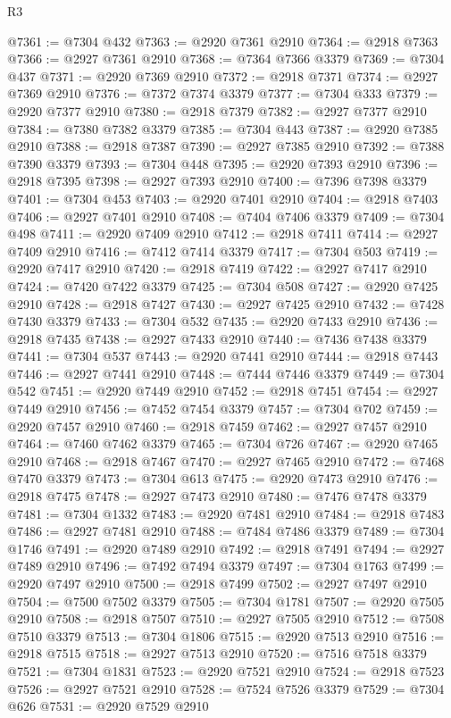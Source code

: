 \begin{lexlean}{R3}
\begin{coremodule}
@7361 := @7304 @432
@7363 := @2920 @7361 @2910
@7364 := @2918 @7363
@7366 := @2927 @7361 @2910
@7368 := @7364 @7366 @3379
@7369 := @7304 @437
@7371 := @2920 @7369 @2910
@7372 := @2918 @7371
@7374 := @2927 @7369 @2910
@7376 := @7372 @7374 @3379
@7377 := @7304 @333
@7379 := @2920 @7377 @2910
@7380 := @2918 @7379
@7382 := @2927 @7377 @2910
@7384 := @7380 @7382 @3379
@7385 := @7304 @443
@7387 := @2920 @7385 @2910
@7388 := @2918 @7387
@7390 := @2927 @7385 @2910
@7392 := @7388 @7390 @3379
@7393 := @7304 @448
@7395 := @2920 @7393 @2910
@7396 := @2918 @7395
@7398 := @2927 @7393 @2910
@7400 := @7396 @7398 @3379
@7401 := @7304 @453
@7403 := @2920 @7401 @2910
@7404 := @2918 @7403
@7406 := @2927 @7401 @2910
@7408 := @7404 @7406 @3379
@7409 := @7304 @498
@7411 := @2920 @7409 @2910
@7412 := @2918 @7411
@7414 := @2927 @7409 @2910
@7416 := @7412 @7414 @3379
@7417 := @7304 @503
@7419 := @2920 @7417 @2910
@7420 := @2918 @7419
@7422 := @2927 @7417 @2910
@7424 := @7420 @7422 @3379
@7425 := @7304 @508
@7427 := @2920 @7425 @2910
@7428 := @2918 @7427
@7430 := @2927 @7425 @2910
@7432 := @7428 @7430 @3379
@7433 := @7304 @532
@7435 := @2920 @7433 @2910
@7436 := @2918 @7435
@7438 := @2927 @7433 @2910
@7440 := @7436 @7438 @3379
@7441 := @7304 @537
@7443 := @2920 @7441 @2910
@7444 := @2918 @7443
@7446 := @2927 @7441 @2910
@7448 := @7444 @7446 @3379
@7449 := @7304 @542
@7451 := @2920 @7449 @2910
@7452 := @2918 @7451
@7454 := @2927 @7449 @2910
@7456 := @7452 @7454 @3379
@7457 := @7304 @702
@7459 := @2920 @7457 @2910
@7460 := @2918 @7459
@7462 := @2927 @7457 @2910
@7464 := @7460 @7462 @3379
@7465 := @7304 @726
@7467 := @2920 @7465 @2910
@7468 := @2918 @7467
@7470 := @2927 @7465 @2910
@7472 := @7468 @7470 @3379
@7473 := @7304 @613
@7475 := @2920 @7473 @2910
@7476 := @2918 @7475
@7478 := @2927 @7473 @2910
@7480 := @7476 @7478 @3379
@7481 := @7304 @1332
@7483 := @2920 @7481 @2910
@7484 := @2918 @7483
@7486 := @2927 @7481 @2910
@7488 := @7484 @7486 @3379
@7489 := @7304 @1746
@7491 := @2920 @7489 @2910
@7492 := @2918 @7491
@7494 := @2927 @7489 @2910
@7496 := @7492 @7494 @3379
@7497 := @7304 @1763
@7499 := @2920 @7497 @2910
@7500 := @2918 @7499
@7502 := @2927 @7497 @2910
@7504 := @7500 @7502 @3379
@7505 := @7304 @1781
@7507 := @2920 @7505 @2910
@7508 := @2918 @7507
@7510 := @2927 @7505 @2910
@7512 := @7508 @7510 @3379
@7513 := @7304 @1806
@7515 := @2920 @7513 @2910
@7516 := @2918 @7515
@7518 := @2927 @7513 @2910
@7520 := @7516 @7518 @3379
@7521 := @7304 @1831
@7523 := @2920 @7521 @2910
@7524 := @2918 @7523
@7526 := @2927 @7521 @2910
@7528 := @7524 @7526 @3379
@7529 := @7304 @626
@7531 := @2920 @7529 @2910

\end{coremodule}
\end{lexlean}
